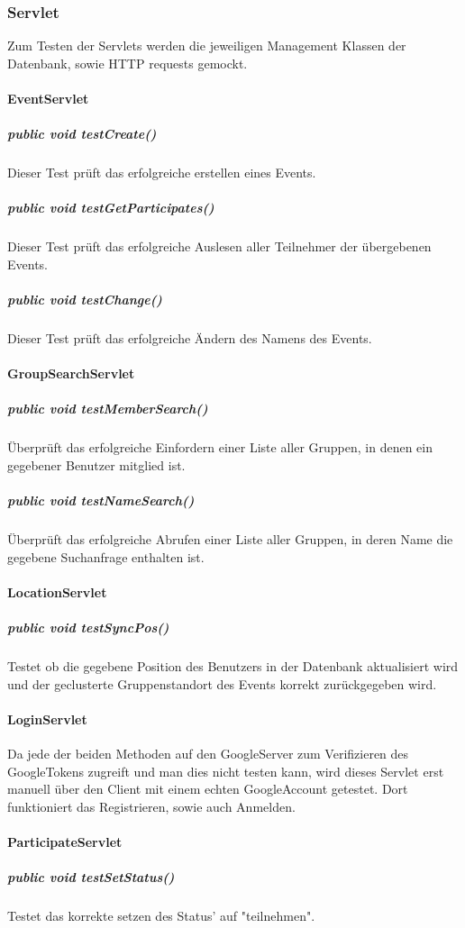 \documentclass{scrartcl}
\begin{document}
	\subsubsection{Servlet}
	Zum Testen der Servlets werden die jeweiligen Management Klassen der Datenbank, sowie HTTP requests gemockt.
	\paragraph{EventServlet}
	\subparagraph{public void testCreate()}
	Dieser Test prüft das erfolgreiche erstellen eines Events. 
	\subparagraph{public void testGetParticipates()}
	Dieser Test prüft das erfolgreiche Auslesen aller Teilnehmer der übergebenen Events.
	\subparagraph{public void testChange()}
	Dieser Test prüft das erfolgreiche Ändern des Namens des Events.
	\paragraph{GroupSearchServlet}
	\subparagraph{public void testMemberSearch()}
	Überprüft das erfolgreiche Einfordern einer Liste aller Gruppen, in denen ein gegebener Benutzer mitglied ist.
	\subparagraph{public void testNameSearch()}
	Überprüft das erfolgreiche Abrufen einer Liste aller Gruppen, in deren Name die gegebene Suchanfrage enthalten ist.
	\paragraph{LocationServlet}
	\subparagraph{public void testSyncPos()}
	Testet ob die gegebene Position des Benutzers in der Datenbank aktualisiert wird und der geclusterte Gruppenstandort des Events korrekt zurückgegeben wird.
	\paragraph{LoginServlet}
	Da jede der beiden Methoden auf den GoogleServer zum Verifizieren des GoogleTokens zugreift und man dies nicht testen kann, wird dieses Servlet erst manuell über den Client mit einem echten GoogleAccount getestet. Dort funktioniert das Registrieren, sowie auch Anmelden.
	\paragraph{ParticipateServlet}
	\subparagraph{public void testSetStatus()}
	Testet das korrekte setzen des Status' auf "teilnehmen".
\end{document}

